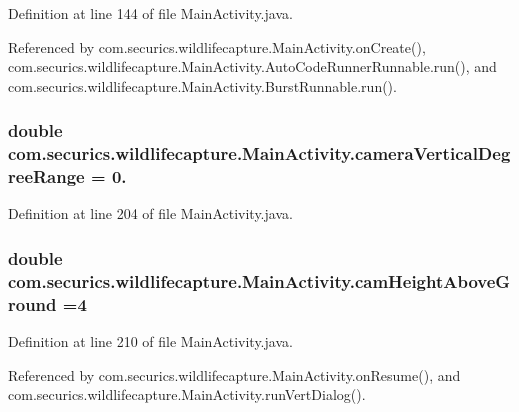 Definition at line 144 of file Main\+Activity.\+java.



Referenced by com.\+securics.\+wildlifecapture.\+Main\+Activity.\+on\+Create(), com.\+securics.\+wildlifecapture.\+Main\+Activity.\+Auto\+Code\+Runner\+Runnable.\+run(), and com.\+securics.\+wildlifecapture.\+Main\+Activity.\+Burst\+Runnable.\+run().

\subsubsection[{camera\+Vertical\+Degree\+Range}]{\setlength{\rightskip}{0pt plus 5cm}double com.\+securics.\+wildlifecapture.\+Main\+Activity.\+camera\+Vertical\+Degree\+Range = 0.\hspace{0.3cm}{\ttfamily [private]}}\label{classcom_1_1securics_1_1wildlifecapture_1_1_main_activity_a111b8b4c0395124314db5ba11884fad9}


Definition at line 204 of file Main\+Activity.\+java.

\subsubsection[{cam\+Height\+Above\+Ground}]{\setlength{\rightskip}{0pt plus 5cm}double com.\+securics.\+wildlifecapture.\+Main\+Activity.\+cam\+Height\+Above\+Ground =4\hspace{0.3cm}{\ttfamily [static]}}\label{classcom_1_1securics_1_1wildlifecapture_1_1_main_activity_a88fb2bdf22d4fb138f7d9ed4c259c7e4}


Definition at line 210 of file Main\+Activity.\+java.



Referenced by com.\+securics.\+wildlifecapture.\+Main\+Activity.\+on\+Resume(), and com.\+securics.\+wildlifecapture.\+Main\+Activity.\+run\+Vert\+Dialog().

